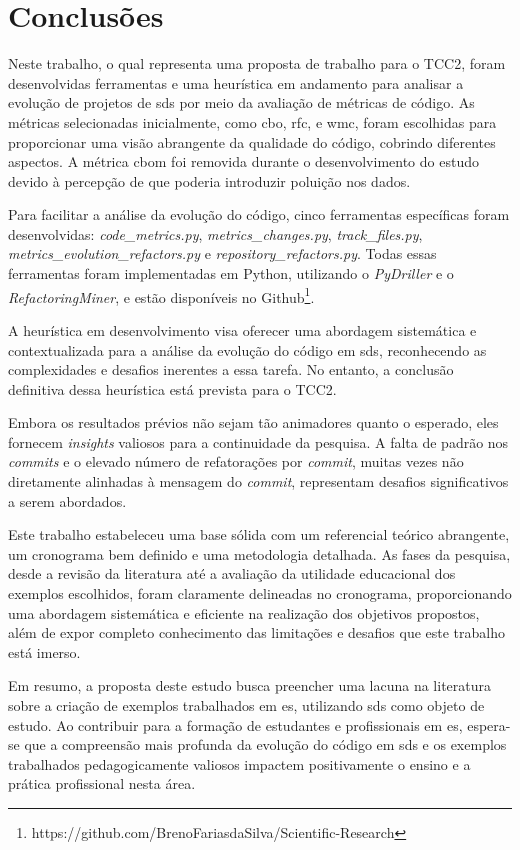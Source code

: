 
\chapter{Conclusões}
\label{cap:conclusoes}

Neste trabalho, o qual representa uma proposta de trabalho para o TCC2, foram desenvolvidas ferramentas e uma heurística em andamento para analisar a evolução de projetos de \gls{sds} por meio da avaliação de métricas de código. As métricas selecionadas inicialmente, como \gls{cbo}, \gls{rfc}, e \gls{wmc}, foram escolhidas para proporcionar uma visão abrangente da qualidade do código, cobrindo diferentes aspectos. A métrica \gls{cbom} foi removida durante o desenvolvimento do estudo devido à percepção de que poderia introduzir poluição nos dados.

Para facilitar a análise da evolução do código, cinco ferramentas específicas foram desenvolvidas: \textit{code\_metrics.py}, \textit{metrics\_changes.py}, \textit{track\_files.py}, \textit{metrics\_evolution\_refactors.py} e \textit{repository\_refactors.py}. Todas essas ferramentas foram implementadas em Python, utilizando o \textit{PyDriller} e o \textit{RefactoringMiner}, e estão disponíveis no Github\footnote{https://github.com/BrenoFariasdaSilva/Scientific-Research}.

A heurística em desenvolvimento visa oferecer uma abordagem sistemática e contextualizada para a análise da evolução do código em \gls{sds}, reconhecendo as complexidades e desafios inerentes a essa tarefa. No entanto, a conclusão definitiva dessa heurística está prevista para o TCC2.

Embora os resultados prévios não sejam tão animadores quanto o esperado, eles fornecem \textit{insights} valiosos para a continuidade da pesquisa. A falta de padrão nos \textit{commits} e o elevado número de refatorações por \textit{commit}, muitas vezes não diretamente alinhadas à mensagem do \textit{commit}, representam desafios significativos a serem abordados.

Este trabalho estabeleceu uma base sólida com um referencial teórico abrangente, um cronograma bem definido e uma metodologia detalhada. As fases da pesquisa, desde a revisão da literatura até a avaliação da utilidade educacional dos exemplos escolhidos, foram claramente delineadas no cronograma, proporcionando uma abordagem sistemática e eficiente na realização dos objetivos propostos, além de expor completo conhecimento das limitações e desafios que este trabalho está imerso.

Em resumo, a proposta deste estudo busca preencher uma lacuna na literatura sobre a criação de exemplos trabalhados em \gls{es}, utilizando \gls{sds} como objeto de estudo. Ao contribuir para a formação de estudantes e profissionais em \gls{es}, espera-se que a compreensão mais profunda da evolução do código em \gls{sds} e os exemplos trabalhados pedagogicamente valiosos impactem positivamente o ensino e a prática profissional nesta área.